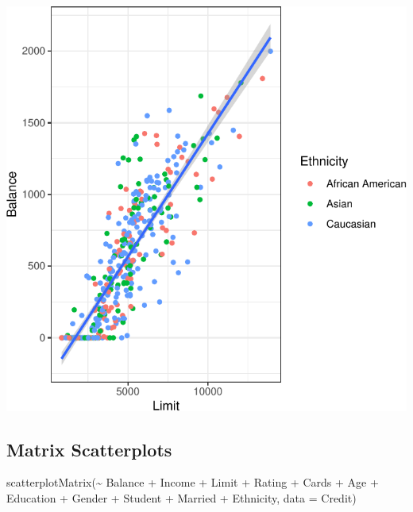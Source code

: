 \documentclass[
]{article}
\newenvironment{Shaded}{\begin{snugshade}}{\end{snugshade}}
\newcommand{\AttributeTok}[1]{\textcolor[rgb]{0.77,0.63,0.00}{#1}}
\newcommand{\FunctionTok}[1]{\textcolor[rgb]{0.00,0.00,0.00}{#1}}
\newcommand{\NormalTok}[1]{#1}
\newcommand{\SpecialCharTok}[1]{\textcolor[rgb]{0.00,0.00,0.00}{#1}}
\begin{document}
\begin{center}\includegraphics{SDM-CHAP24_files/figure-latex/oneline-1} \end{center}

\hypertarget{matrix-scatterplots}{%
\subsection{Matrix Scatterplots}\label{matrix-scatterplots}}

\begin{Shaded}
\begin{Highlighting}[]
\FunctionTok{scatterplotMatrix}\NormalTok{(}\SpecialCharTok{\textasciitilde{}}\NormalTok{ Balance }\SpecialCharTok{+}\NormalTok{ Income }\SpecialCharTok{+}\NormalTok{ Limit }\SpecialCharTok{+}\NormalTok{ Rating }\SpecialCharTok{+}\NormalTok{ Cards }\SpecialCharTok{+}\NormalTok{ Age }\SpecialCharTok{+}\NormalTok{ Education }\SpecialCharTok{+}\NormalTok{ Gender }\SpecialCharTok{+}\NormalTok{ Student }\SpecialCharTok{+}\NormalTok{ Married }\SpecialCharTok{+}\NormalTok{ Ethnicity,  }\AttributeTok{data =}\NormalTok{ Credit)}
\end{Highlighting}
\end{Shaded}
\end{document}
